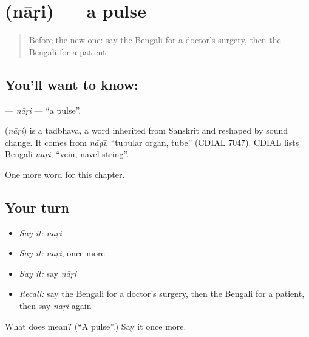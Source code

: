 \section[\texorpdfstring{\bn{নাড়ি} (nāṛi)}{নাড়ি (nāṛi)}]{ (nāṛi) — a pulse}

\label{lesson:BN-C215-nari}



\begin{quote}
Before the new one: say the Bengali for a doctor's surgery, then the Bengali for a patient.
\end{quote}

\subsection*{You'll want to know: }
\textbf{} — \emph{nāṛi} — \textquotedblleft{}a pulse\textquotedblright{}.

\begin{cousinweb}
\textbf{} (\emph{nāṛi}) is a tadbhava, a word inherited from Sanskrit and reshaped by sound change. It comes from \emph{nāḍī}, \textquotedblleft{}tubular organ, tube\textquotedblright{} (CDIAL 7047). CDIAL lists Bengali \emph{nāṛi}, \textquotedblleft{}vein, navel string\textquotedblright{}.
\end{cousinweb}

\begin{grammarlens}[title={What you've built}]
One more word for this chapter.
\end{grammarlens}

\subsection*{Your turn}
\begin{itemize}
\raggedright
  \item \emph{Say it:} \emph{nāṛi}
  \item \emph{Say it:} \emph{nāṛi}, once more
  \item \emph{Say it:} say \emph{nāṛi}
  \item \emph{Recall:} say the Bengali for a doctor's surgery, then the Bengali for a patient, then say \emph{nāṛi} again
\end{itemize}

\begin{tcolorbox}[breakable,colback=teal!4,colframe=teal!35!black,title={Before you move on}]
What does  mean? (\textquotedblleft{}A pulse\textquotedblright{}.) Say it once more.
\end{tcolorbox}
